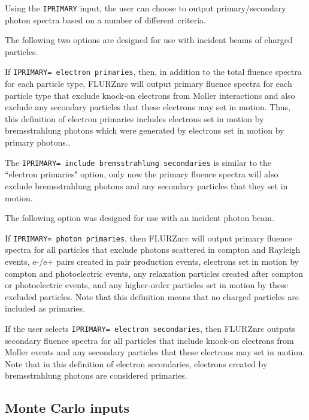 \documentclass[12pt,twoside]{article}  %
\begin{document}
Using the {\tt IPRIMARY} input, the user can choose to output primary/secondary photon spectra based on a number of different criteria.  

The following two options are designed for use with incident beams of
charged particles.

If {\tt IPRIMARY= electron primaries}, then, in addition to the total fluence
spectra for each particle type, FLURZnrc will output primary fluence
spectra for each particle type that exclude knock-on electrons from
Moller interactions and also exclude any secondary particles that these electrons may
set in motion.  Thus, this definition of electron primaries includes electrons
set in motion by bremsstrahlung photons which were generated by electrons
set in motion by primary photons..

The {\tt IPRIMARY= include bremsstrahlung secondaries} is similar to the
``electron primaries" option, only now the primary fluence spectra will
also exclude bremsstrahlung photons and any secondary particles that they
set in motion.

The following option was designed for use with an incident photon beam.

If {\tt IPRIMARY= photon primaries}, then FLURZnrc will output
primary fluence spectra for all particles that exclude photons scattered
in compton and Rayleigh events, e-/e+ pairs created in pair production
events, electrons set in motion by compton and photoelectric events, any
relaxation particles created after compton or photoelectric events, and
any higher-order particles set in motion by these excluded particles.
Note that this definition means that no charged particles are included as
primaries.

If the user selects {\tt IPRIMARY= electron secondaries}, then FLURZnrc outputs
secondary fluence spectra for all particles that include knock-on electrons
from Moller events and any secondary particles that these electrons may set
in motion.  Note that in this definition of electron secondaries, electrons
created by bremsstrahlung photons are considered primaries. 

\subsection{Monte Carlo inputs}
\end{document}
